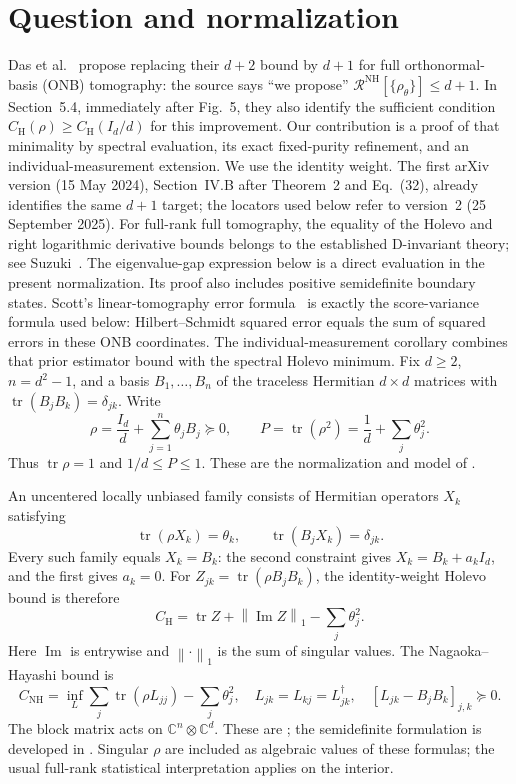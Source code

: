 \documentclass[11pt]{article}
\newcommand{\tr}{\operatorname{tr}}
\newcommand{\Id}{I}
\newcommand{\CH}{C_{\mathrm H}}
\newcommand{\CN}{C_{\mathrm{NH}}}
\newcommand{\normone}[1]{\left\lVert#1\right\rVert_1}
\begin{document}
\section{Question and normalization}
Das et al.\ \cite[Sec.~3.2.1, paragraph after Theorem~3; Sec.~5.4,
paragraph after Eq.~(49)]{Das} propose replacing their $d+2$ bound by $d+1$
for full orthonormal-basis (ONB) tomography: the source says
``we propose'' $\mathcal R^{\mathrm{NH}}[\{\rho_\theta\}]\leq d+1$.
In Section~5.4, immediately after Fig.~5, they also identify the sufficient
condition $\CH(\rho)\geq\CH(\Id_d/d)$ for this improvement.
Our contribution is a proof of that minimality by spectral evaluation,
its exact fixed-purity refinement, and an individual-measurement extension.
We use the identity weight. The first arXiv version (15 May 2024), Section~IV.B
after Theorem~2 and Eq.~(32), already identifies the same $d+1$ target;
the locators used below refer to version~2 (25 September 2025).
For full-rank full tomography, the equality of the Holevo and right
logarithmic derivative bounds belongs to the established D-invariant
theory; see Suzuki~\cite[Sec.~4.1.2, Proposition~2]{Suzuki}.
The eigenvalue-gap expression below is a direct evaluation in the present
normalization. Its proof also includes positive semidefinite boundary states.
Scott's linear-tomography error formula~\cite[Sec.~VI, Eqs.~(101)--(103)]{Scott}
is exactly the score-variance formula used below: Hilbert--Schmidt squared
error equals the sum of squared errors in these ONB coordinates.
The individual-measurement corollary combines that prior estimator bound
with the spectral Holevo minimum.
Fix $d\geq2$, $n=d^2-1$, and a basis
$B_1,\ldots,B_n$ of the traceless Hermitian $d\times d$ matrices with
$\tr(B_jB_k)=\delta_{jk}$. Write
\[
 \rho=\frac{\Id_d}{d}+\sum_{j=1}^n\theta_j B_j\succeq0,
 \qquad P=\tr(\rho^2)=\frac1d+\sum_j\theta_j^2.
\]
Thus $\tr\rho=1$ and $1/d\leq P\leq1$. These are the normalization and
model of \cite[Sec.~5.2, Eq.~(23); Appendix~A]{Das}.

An uncentered locally unbiased family consists of Hermitian operators
$X_k$ satisfying
\[
 \tr(\rho X_k)=\theta_k,\qquad
 \tr(B_jX_k)=\delta_{jk}.
\]
Every such family equals $X_k=B_k$: the second constraint gives
$X_k=B_k+a_k\Id_d$, and the first gives $a_k=0$.
For $Z_{jk}=\tr(\rho B_jB_k)$, the identity-weight Holevo bound is therefore
\begin{equation}\label{eq:costs}
 \CH=\tr Z+\normone{\operatorname{Im}Z}-\sum_j\theta_j^2.
\end{equation}
Here $\operatorname{Im}$ is entrywise and $\normone{\cdot}$ is the sum of
singular values. The Nagaoka--Hayashi bound is
\begin{equation}\label{eq:nh}
 \CN=\inf_L\sum_j\tr(\rho L_{jj})-\sum_j\theta_j^2,
 \quad L_{jk}=L_{kj}=L_{jk}^{\dagger},\quad
 [L_{jk}-B_jB_k]_{j,k}\succeq0.
\end{equation}
The block matrix acts on $\mathbb C^n\otimes\mathbb C^d$.
These are \cite[Eqs.~(4), (6)]{Das}; the semidefinite formulation is
developed in \cite{Conlon}. Singular $\rho$ are included as algebraic
values of these formulas; the usual full-rank statistical interpretation
applies on the interior.
\end{document}

